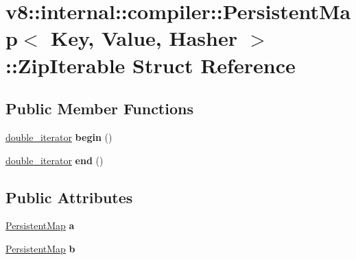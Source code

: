 \hypertarget{structv8_1_1internal_1_1compiler_1_1PersistentMap_1_1ZipIterable}{}\section{v8\+:\+:internal\+:\+:compiler\+:\+:Persistent\+Map$<$ Key, Value, Hasher $>$\+:\+:Zip\+Iterable Struct Reference}
\label{structv8_1_1internal_1_1compiler_1_1PersistentMap_1_1ZipIterable}
\subsection*{Public Member Functions}
\begin{DoxyCompactItemize}
\item 
\mbox{\label{structv8_1_1internal_1_1compiler_1_1PersistentMap_1_1ZipIterable_aa313d30363b37893d186fb5c85f30975}} 
\mbox{\hyperlink{classv8_1_1internal_1_1compiler_1_1PersistentMap_1_1double__iterator}{double\+\_\+iterator}} {\bfseries begin} ()
\item 
\mbox{\label{structv8_1_1internal_1_1compiler_1_1PersistentMap_1_1ZipIterable_acb7f80869c1a2052b65719ea49fdabe3}} 
\mbox{\hyperlink{classv8_1_1internal_1_1compiler_1_1PersistentMap_1_1double__iterator}{double\+\_\+iterator}} {\bfseries end} ()
\end{DoxyCompactItemize}
\subsection*{Public Attributes}
\begin{DoxyCompactItemize}
\item 
\mbox{\label{structv8_1_1internal_1_1compiler_1_1PersistentMap_1_1ZipIterable_ac75a16f99763ed7286262a5d4a22068d}} 
\mbox{\hyperlink{classv8_1_1internal_1_1compiler_1_1PersistentMap}{Persistent\+Map}} {\bfseries a}
\item 
\mbox{\label{structv8_1_1internal_1_1compiler_1_1PersistentMap_1_1ZipIterable_acffb34f083ec0eb23c3955c4c3d27135}} 
\mbox{\hyperlink{classv8_1_1internal_1_1compiler_1_1PersistentMap}{Persistent\+Map}} {\bfseries b}
\end{DoxyCompactItemize}



